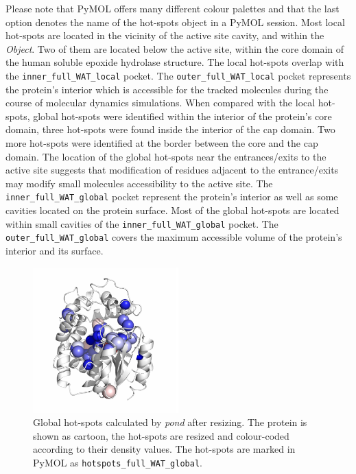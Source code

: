 \documentclass[9pt,tutorial, pubversion]{livecoms}
\begin{document}
Please note that PyMOL offers many different colour palettes and that the last option denotes the name of the hot-spots object in a PyMOL session. Most local hot-spots are located in the vicinity of the active site cavity, and within the \emph{Object}. Two of them are located below the active site, within the core domain of the human soluble epoxide hydrolase structure. The local hot-spots overlap with the \texttt{inner\_full\_WAT\_local} pocket. The \texttt{outer\_full\_WAT\_local} pocket represents the protein's interior which is accessible for the tracked molecules during the course of molecular dynamics simulations. When compared with the local hot-spots, global hot-spots were identified within the interior of the protein's core domain, three hot-spots were found inside the interior of the cap domain. Two more hot-spots were identified at the border between the core and the cap domain. The location of the global hot-spots near the entrances/exits to the active site suggests that modification of residues adjacent to the entrance/exits may modify small molecules accessibility to the active site. The \texttt{inner\_full\_WAT\_global} pocket represent the protein's interior as well as some cavities located on the protein surface. Most of the global hot-spots are located within small cavities of the \texttt{inner\_full\_WAT\_global} pocket. The \texttt{outer\_full\_WAT\_global} covers the maximum accessible volume of the protein's interior and its surface.

\begin{figure}[ht!]
\centering
\includegraphics[width=0.5\textwidth]{Tut4.4.png}
\caption{Global hot-spots calculated by \textit{pond} after resizing. The protein is shown as cartoon, the hot-spots are resized and colour-coded according to their density values. The hot-spots are marked in PyMOL as \texttt{hotspots\_full\_WAT\_global}.}
\label{Tut4.4}
\end{figure}
\end{document}
